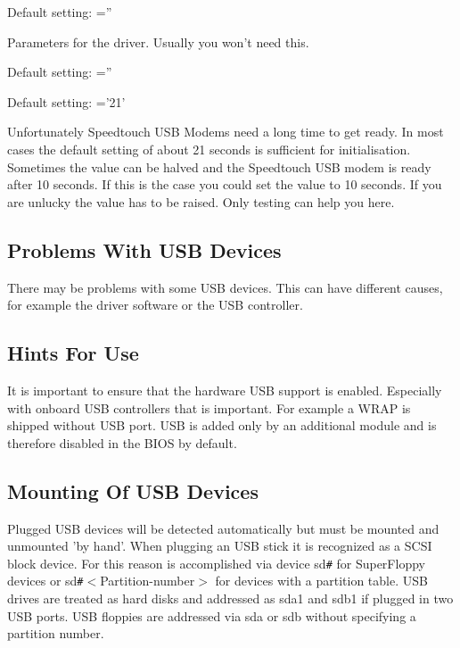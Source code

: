 \begin{description}
        Default setting: =''


        Parameters for the driver. Usually you won't need this.

        Default setting: =''


        Default setting: ='21'

        Unfortunately Speedtouch USB Modems need a long time to get 
        ready. In most cases the default setting of about 21 seconds is sufficient 
        for initialisation. Sometimes the value can be halved and the
        Speedtouch USB modem is ready after 10 seconds. If this is the case you 
        could set the value to 10 seconds. If you are unlucky the value has to 
        be raised. Only testing can help you here.

\end{description}

\subsection{Problems With USB Devices}

There may be problems with some USB devices. This can have different
causes, for example the driver software or the USB controller.

\subsection{Hints For Use}

It is important to ensure that the hardware USB support is enabled. Especially 
with onboard USB controllers that is important. For example a WRAP is shipped 
without USB port. USB is added only by an additional module and is therefore 
disabled in the BIOS by default.

\subsection{Mounting Of USB Devices}

Plugged USB devices will be detected automatically but must be mounted and 
unmounted 'by hand'. When plugging an USB stick it is recognized as a SCSI 
block device. For this reason is accomplished via device sd\verb=#= for 
SuperFloppy devices or sd\verb=#=$<$Partition-number$>$ for devices with 
a partition table. USB drives are treated as hard disks and addressed as 
sda1 and sdb1 if plugged in two USB ports. USB floppies are addressed via 
sda or sdb without specifying a partition number.


